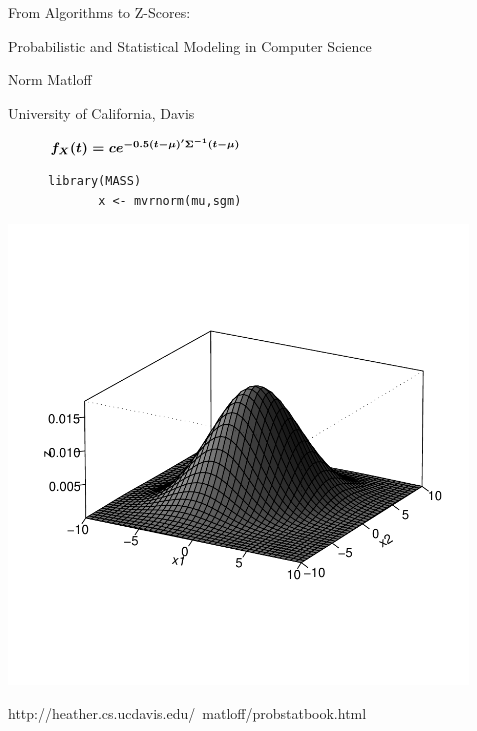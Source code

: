 \documentclass[20pt]{article}
\begin{document}

\pagecolor{MidnightBlue}
\color{white}

\begin{center}
{\Huge From Algorithms to Z-Scores: 

\bigskip

Probabilistic and Statistical Modeling in Computer Science}

\bigskip

{\LARGE Norm Matloff 

\medskip

University of California, Davis}
\end{center}

\vspace{0.9in}

\begin{center}
\begin{figure}[ht]
\color{white}
   \begin{minipage}[b]{0.55\linewidth}
       \Large
       $
       \mbox{\boldmath$ f_X(t) = c e^{-0.5 (t-\mu)'\Sigma^{-1}(t-\mu)}$ } 
       $
   \end{minipage}
   \hspace{0.1in}
   \begin{minipage}[b]{0.58\linewidth}
       {\bf
       \begin{Verbatim}[fontsize=\relsize{+1}]
       library(MASS) 
       x <- mvrnorm(mu,sgm)
       \end{Verbatim}
       }
   \end{minipage}
\end{figure}
\end{center}

\vspace{-0.5in}
\centering
\includegraphics[width=4.8in]{Bell.pdf}

{\LARGE
{http://heather.cs.ucdavis.edu/~matloff/probstatbook.html}
}
\end{document}
